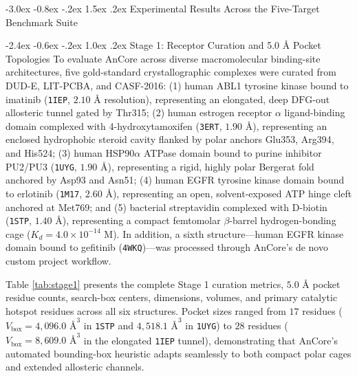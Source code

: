 \documentclass[11pt,a4paper]{article}
\makeatletter
\renewcommand{\section}{\@startsection{section}{1}{\z@}%
  {-3.0ex \@plus -0.8ex \@minus -.2ex}%
  {1.5ex \@plus.2ex}%
  {\normalfont\Large\bfseries\color{primary}}}
\renewcommand{\subsection}{\@startsection{subsection}{2}{\z@}%
  {-2.4ex \@plus -0.6ex \@minus -.2ex}%
  {1.0ex \@plus .2ex}%
  {\normalfont\large\bfseries\color{primary}}}
\makeatother
\begin{document}
\section{Experimental Results Across the Five-Target Benchmark Suite}

\subsection{Stage 1: Receptor Curation and 5.0 \AA{} Pocket Topologies}
\noindent To evaluate AnCore across diverse macromolecular binding-site architectures, five gold-standard crystallographic complexes were curated from DUD-E, LIT-PCBA, and CASF-2016: (1) human ABL1 tyrosine kinase bound to imatinib (\texttt{1IEP}, $2.10\text{ \AA}$ resolution), representing an elongated, deep $\text{DFG}$-out allosteric tunnel gated by Thr315; (2) human estrogen receptor $\alpha$ ligand-binding domain complexed with 4-hydroxytamoxifen (\texttt{3ERT}, $1.90\text{ \AA}$), representing an enclosed hydrophobic steroid cavity flanked by polar anchors Glu353, Arg394, and His524; (3) human HSP90$\alpha$ ATPase domain bound to purine inhibitor PU2/PU3 (\texttt{1UYG}, $1.90\text{ \AA}$), representing a rigid, highly polar Bergerat fold anchored by Asp93 and Asn51; (4) human EGFR tyrosine kinase domain bound to erlotinib (\texttt{1M17}, $2.60\text{ \AA}$), representing an open, solvent-exposed ATP hinge cleft anchored at Met769; and (5) bacterial streptavidin complexed with D-biotin (\texttt{1STP}, $1.40\text{ \AA}$), representing a compact femtomolar $\beta$-barrel hydrogen-bonding cage ($K_d = 4.0\times 10^{-14}\text{ M}$). In addition, a sixth structure---human EGFR kinase domain bound to gefitinib (\texttt{4WKQ})---was processed through AnCore's de novo custom project workflow.

Table \ref{tab:stage1} presents the complete Stage 1 curation metrics, $5.0\text{ \AA}$ pocket residue counts, search-box centers, dimensions, volumes, and primary catalytic hotspot residues across all six structures. Pocket sizes ranged from $17$ residues ($V_{\text{box}} = 4,096.0\text{ \AA}^3$ in \texttt{1STP} and $4,518.1\text{ \AA}^3$ in \texttt{1UYG}) to $28$ residues ($V_{\text{box}} = 8,609.0\text{ \AA}^3$ in the elongated \texttt{1IEP} tunnel), demonstrating that AnCore's automated bounding-box heuristic adapts seamlessly to both compact polar cages and extended allosteric channels.
\end{document}
